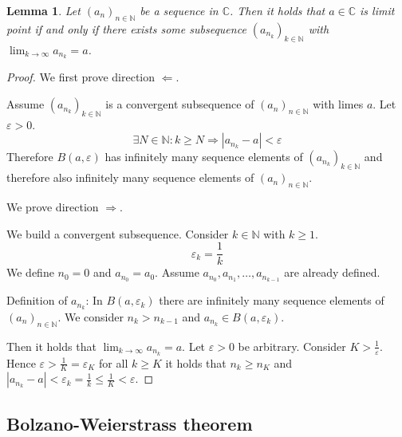 \documentclass[a4paper,landscape,twocolumn]{article}
\newtheorem{lemma}{Lemma}
\newcommand\abs[1]{\left|#1\right|}
\newcommand\seq[1]{{\left(#1\right)}_{n \in \mathbb N}}
\begin{document}
\begin{lemma}
  Let $\seq{a_n}$ be a sequence in $\mathbb C$. Then it holds that
  $a \in \mathbb C$ is limit point if and only if there exists some subsequence
  $\left(a_{n_k}\right)_{k \in \mathbb N}$ with $\lim_{k \to \infty} a_{n_k} = a$.
\end{lemma}
\begin{proof}
  We first prove direction $\Leftarrow$.

  Assume $\left(a_{n_k}\right)_{k \in \mathbb N}$ is a convergent subsequence
  of $\seq{a_n}$ with limes $a$.
  Let $\varepsilon > 0$.
  \[ \exists N \in \mathbb N: k \geq N \Rightarrow \abs{a_{n_k} - a} < \varepsilon \]
  Therefore $B(a, \varepsilon)$ has infinitely many sequence elements of $\left(a_{n_k}\right)_{k\in\mathbb N}$
  and therefore also infinitely many sequence elements of $\seq{a_n}$.

  We prove direction $\Rightarrow$.

  We build a convergent subsequence. Consider $k \in \mathbb N$ with $k \geq 1$.
  \[ \varepsilon_k = \frac1k \]
  We define $n_0 = 0$ and $a_{n_0} = a_0$.
  Assume $a_{n_0}, a_{n_1}, \dots, a_{n_{k-1}}$ are already defined.

  Definition of $a_{n_k}$: In $B(a, \varepsilon_k)$ there are infinitely many sequence elements of $\seq{a_n}$.
  We consider $n_k > n_{k-1}$ and $a_{n_k} \in B(a, \varepsilon_k)$.

  Then it holds that $\lim_{k\to\infty} a_{n_k} = a$.
  Let $\varepsilon > 0$ be arbitrary. Consider $K > \frac1\varepsilon$.
  Hence $\varepsilon > \frac1K = \varepsilon_K$ for all $k \geq K$ it holds that
  $n_k \geq n_K$ and $\abs{a_{n_k} - a} < \varepsilon_k = \frac1k \leq \frac1K < \varepsilon$.
\end{proof}

\subsection{Bolzano-Weierstrass theorem}
\end{document}
